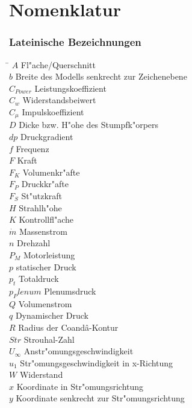 \chapter*{Nomenklatur}

\subsection*{Lateinische Bezeichnungen}
\begin{tabbing}
\hspace*{2cm}\=\kill
$A$ \> Fl"ache/Querschnitt \\[0.2ex]
$b$ \> Breite des Modells senkrecht zur Zeichenebene \\[0.2ex]
$C_{Power}$ \> Leistungskoeffizient \\[0.2ex]
$C_w$ \> Widerstandsbeiwert \\[0.2ex]
$C_{\mu}$ \> Impulskoeffizient \\[0.2ex]
$D$ \> Dicke bzw. H"ohe des Stumpfk"orpers \\[0.2ex]
$dp$ \> Druckgradient \\[0.2ex]
$f$ \> Frequenz \\[0.2ex]
$F$ \> Kraft \\[0.2ex]
$F_{K}$ \> Volumenkr"afte \\[0.2ex]
$F_{P}$ \> Druckkr"afte \\[0.2ex]
$F_{S}$ \> St"utzkraft \\[0.2ex]
$H$ \> Strahlh"ohe \\[0.2ex]
$K$ \> Kontrollfl"ache \\[0.2ex]
$\dot{m}$ \> Massenstrom \\[0.2ex]
$n$ \> Drehzahl \\[0.2ex]
$P_M$ \> Motorleistung \\[0.2ex]
$p$ \> statischer Druck \\[0.2ex]
$p_t$ \> Totaldruck \\[0.2ex]
$p_Plenum$ \> Plenumsdruck \\[0.2ex]
$Q$ \> Volumenstrom \\[0.2ex]
$q$ \> Dynamischer Druck \\[0.2ex]
$R$ \> Radius der Coand\^{a}-Kontur \\[0.2ex]
$Str$ \> Strouhal-Zahl \\[0.2ex]
$U_{\infty}$ \> Anstr"omungsgeschwindigkeit \\[0.2ex]
$u_1$ \> Str"omungsgeschwindigkeit in x-Richtung \\[0.2ex]
$W$ \> Widerstand \\[0.2ex]
$x$ \> Koordinate in Str"omungsrichtung \\[0.2ex]
$y$ \> Koordinate senkrecht zur Str"omungsrichtung \\[0.2ex]
\end{tabbing}



